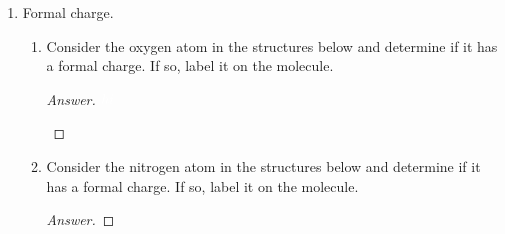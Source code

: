 \documentclass[../psets.tex]{subfiles}
\begin{document}
\begin{enumerate}
\begin{enumerate}
\begin{enumerate}
\begin{proof}[Answer]
\begin{equation*}
                \end{equation*}
            \end{proof}
        \end{enumerate}
    \end{enumerate}
    \item Formal charge.
    \begin{enumerate}
        \item Consider the oxygen atom in the structures below and determine if it has a formal charge. If so, label it on the molecule.
        \begin{proof}[Answer]
            ${\color{white}hi}$
            \begin{figure}[H]
                \centering
                \small
                \begin{subfigure}[b]{0.19\linewidth}
                    \centering
                \end{subfigure}
                \begin{subfigure}[b]{0.19\linewidth}
                    \centering
                \end{subfigure}
                \begin{subfigure}[b]{0.19\linewidth}
                    \centering
                \end{subfigure}
                \begin{subfigure}[b]{0.19\linewidth}
                    \centering
                \end{subfigure}
                \begin{subfigure}[b]{0.19\linewidth}
                    \centering
                \end{subfigure}
            \end{figure}
        \end{proof}
        \item Consider the nitrogen atom in the structures below and determine if it has a formal charge. If so, label it on the molecule.
        \begin{proof}[Answer]

\end{proof}
\end{enumerate}
\end{enumerate}
\end{document}

